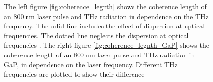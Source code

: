 \begin{figure}
\begin{subfigure}{.5\textwidth}
        \label{fig:coherence_length_GaP}
    \end{subfigure}%
    \caption{The left figure \ref{fig:coherence_legnth} shows the coherence length of an $\SI{800}{\nano\meter}$ laser pulse and $\si{\tera\hertz}$ radiation in dependence on the $\si{\tera\hertz}$ frequency.
    The solid line includes the effect of dispersion at optical frequencies. The dotted line neglects the dispersion at optical frequencies \cite{coherence_legnth}.
    The right figure \ref{fig:coherence_legnth_GaP} shows the coherence length of an $\SI{800}{\nano\meter}$ laser pulse and $\si{\tera\hertz}$ radiation in GaP, in dependence on the laser frequency.
    Different $\si{\tera\hertz}$ frequencies are plotted to show their difference \cite{GaP_coherence_length}}
    \label{fig:coherence_length_both}
\end{figure}
